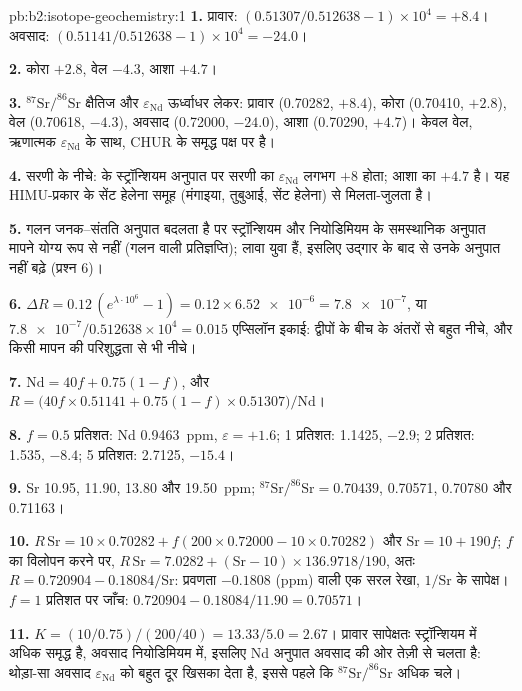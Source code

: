 \begin{solution}{pb:b2:isotope-geochemistry:1}
\textbf{1.} प्रावार: $(0.51307/0.512638 - 1)\times10^4 = +8.4$। अवसाद:
$(0.51141/0.512638 - 1)\times10^4 = -24.0$।

\textbf{2.} कोरा $+2.8$, वेल $-4.3$, आशा $+4.7$।

\textbf{3.} $^{87}\mathrm{Sr}/^{86}\mathrm{Sr}$ क्षैतिज और $\varepsilon_{\mathrm{Nd}}$ ऊर्ध्वाधर लेकर:
प्रावार (0.70282, $+8.4$), कोरा (0.70410, $+2.8$), वेल (0.70618, $-4.3$), अवसाद
(0.72000, $-24.0$), आशा (0.70290, $+4.7$)। केवल वेल, ऋणात्मक
$\varepsilon_{\mathrm{Nd}}$ के साथ, CHUR के समृद्ध पक्ष पर है।

\textbf{4.} सरणी के नीचे:  के स्ट्रॉन्शियम अनुपात पर सरणी का
$\varepsilon_{\mathrm{Nd}}$ लगभग $+8$ होता; आशा का $+4.7$ है। यह
HIMU-प्रकार के सेंट हेलेना समूह (मंगाइया, तुबुआई, सेंट हेलेना) से मिलता-जुलता है।

\textbf{5.} गलन जनक--संतति अनुपात बदलता है पर स्ट्रॉन्शियम और नियोडिमियम के
समस्थानिक अनुपात मापने योग्य रूप से नहीं (गलन वाली प्रतिज्ञप्ति); लावा
युवा हैं, इसलिए उद्गार के बाद से उनके अनुपात नहीं बढ़े (प्रश्न 6)।

\textbf{6.} $\Delta R = 0.12\,(e^{\lambda\cdot10^6} - 1) = 0.12\times\num{6.52e-6} =
\num{7.8e-7}$, या $\num{7.8e-7}/0.512638\times10^4 = 0.015$ एप्सिलॉन इकाई: द्वीपों के बीच के
अंतरों से बहुत नीचे, और किसी मापन की परिशुद्धता से भी नीचे।

\textbf{7.} $\mathrm{Nd} = 40f + 0.75(1-f)$, और
$R = \bigl(40f\times0.51141 + 0.75(1-f)\times0.51307\bigr)/\mathrm{Nd}$।

\textbf{8.} $f = 0.5$ प्रतिशत: Nd \qty{0.9463}{ppm}, $\varepsilon = +1.6$; 1 प्रतिशत:
1.1425, $-2.9$; 2 प्रतिशत: 1.535, $-8.4$; 5 प्रतिशत: 2.7125, $-15.4$।

\textbf{9.} Sr 10.95, 11.90, 13.80 और \qty{19.50}{ppm}; $^{87}\mathrm{Sr}/^{86}\mathrm{Sr} =
0.70439$, 0.70571, 0.70780 और 0.71163।

\textbf{10.} $R\,\mathrm{Sr} = 10\times0.70282 + f(200\times0.72000 - 10\times0.70282)$ और
$\mathrm{Sr} = 10 + 190f$; $f$ का विलोपन करने पर, $R\,\mathrm{Sr} = 7.0282 +
(\mathrm{Sr}-10)\times136.9718/190$, अतः $R = 0.720904 - 0.18084/\mathrm{Sr}$: प्रवणता $-0.1808$ (ppm) वाली एक सरल
रेखा, $1/\mathrm{Sr}$ के सापेक्ष। $f = 1$ प्रतिशत पर जाँच:
$0.720904 - 0.18084/11.90 = 0.70571$।

\textbf{11.} $K = (10/0.75)/(200/40) = 13.33/5.0 = 2.67$। प्रावार सापेक्षतः
स्ट्रॉन्शियम में अधिक समृद्ध है, अवसाद नियोडिमियम में, इसलिए Nd अनुपात
अवसाद की ओर तेज़ी से चलता है: थोड़ा-सा अवसाद $\varepsilon_{\mathrm{Nd}}$ को बहुत दूर खिसका देता है, इससे पहले कि
$^{87}\mathrm{Sr}/^{86}\mathrm{Sr}$ अधिक चले।


\end{solution}
